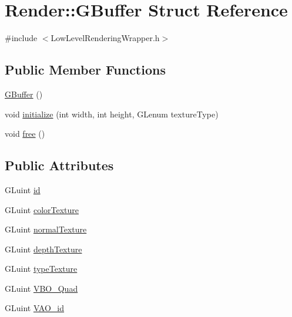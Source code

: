 \hypertarget{struct_render_1_1_g_buffer}{}\section{Render\+:\+:G\+Buffer Struct Reference}
\label{struct_render_1_1_g_buffer}


{\ttfamily \#include $<$Low\+Level\+Rendering\+Wrapper.\+h$>$}

\subsection*{Public Member Functions}
\begin{DoxyCompactItemize}
\item 
\hyperlink{struct_render_1_1_g_buffer_a0a936848b4f7728aed4e092ed4445c55}{G\+Buffer} ()
\item 
void \hyperlink{struct_render_1_1_g_buffer_abe7c5653737ad2ed9e474f210a090a79}{initialize} (int width, int height, G\+Lenum texture\+Type)
\item 
void \hyperlink{struct_render_1_1_g_buffer_afd477c78cf3c329ecd7b6156f4493464}{free} ()
\end{DoxyCompactItemize}
\subsection*{Public Attributes}
\begin{DoxyCompactItemize}
\item 
G\+Luint \hyperlink{struct_render_1_1_g_buffer_af953e00040a4659ae7d7352b0ca23e6f}{id}
\item 
G\+Luint \hyperlink{struct_render_1_1_g_buffer_a8c2e1584753e1546f48075ca3e542bb5}{color\+Texture}
\item 
G\+Luint \hyperlink{struct_render_1_1_g_buffer_a677424e2504157f7d7581f5846c5e495}{normal\+Texture}
\item 
G\+Luint \hyperlink{struct_render_1_1_g_buffer_a09d1f47074b9024515041fa813bf05c3}{depth\+Texture}
\item 
G\+Luint \hyperlink{struct_render_1_1_g_buffer_a49ff8613babaa597e9104da8816beda2}{type\+Texture}
\item 
G\+Luint \hyperlink{struct_render_1_1_g_buffer_a1355609eac190e5aaccf2923cc8ae6f2}{V\+B\+O\+\_\+\+Quad}
\item 
G\+Luint \hyperlink{struct_render_1_1_g_buffer_a2b51083537c9bd11c9106fe8cca8222b}{V\+A\+O\+\_\+id}
\end{DoxyCompactItemize}



